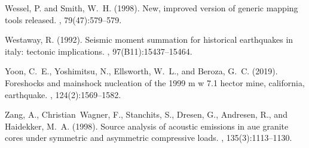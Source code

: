 \documentclass[a4paper,12pt,twoside]{article}
\begin{document}
\begin{thebibliography}{}
Wessel, P. and Smith, W.~H. (1998).
\newblock New, improved version of generic mapping tools released.
, 79(47):579--579.

Westaway, R. (1992).
\newblock Seismic moment summation for historical earthquakes in italy:
  tectonic implications.
,
  97(B11):15437--15464.

Yoon, C.~E., Yoshimitsu, N., Ellsworth, W.~L., and Beroza, G.~C. (2019).
\newblock Foreshocks and mainshock nucleation of the 1999 m w 7.1 hector mine,
  california, earthquake.
,
  124(2):1569--1582.

Zang, A., Christian~Wagner, F., Stanchits, S., Dresen, G., Andresen, R., and
  Haidekker, M.~A. (1998).
\newblock Source analysis of acoustic emissions in aue granite cores under
  symmetric and asymmetric compressive loads.
, 135(3):1113--1130.

\end{thebibliography}
\end{document}
